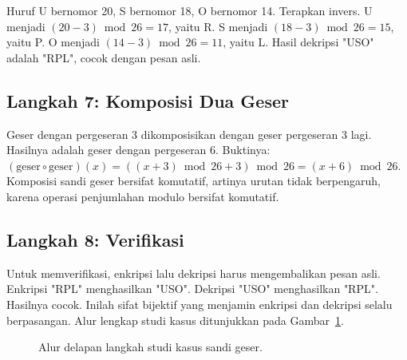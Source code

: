 \documentclass[11pt,a4paper]{article}
\begin{document}
Huruf U bernomor 20, S bernomor 18, O bernomor 14. Terapkan invers. U menjadi $(20-3) \bmod 26=17$, yaitu R. S menjadi $(18-3) \bmod 26=15$, yaitu P. O menjadi $(14-3) \bmod 26=11$, yaitu L. Hasil dekripsi "USO" adalah "RPL", cocok dengan pesan asli.

\subsection{Langkah 7: Komposisi Dua Geser}

Geser dengan pergeseran 3 dikomposisikan dengan geser pergeseran 3 lagi. Hasilnya adalah geser dengan pergeseran 6. Buktinya: $(\text{geser} \circ \text{geser})(x)=((x+3) \bmod 26+3) \bmod 26=(x+6) \bmod 26$. Komposisi sandi geser bersifat komutatif, artinya urutan tidak berpengaruh, karena operasi penjumlahan modulo bersifat komutatif.

\subsection{Langkah 8: Verifikasi}

Untuk memverifikasi, enkripsi lalu dekripsi harus mengembalikan pesan asli. Enkripsi "RPL" menghasilkan "USO". Dekripsi "USO" menghasilkan "RPL". Hasilnya cocok. Inilah sifat bijektif yang menjamin enkripsi dan dekripsi selalu berpasangan. Alur lengkap studi kasus ditunjukkan pada Gambar~\ref{fig:alur-sandi}.

\begin{figure}[H]
	\centering
	\caption{Alur delapan langkah studi kasus sandi geser.}
	\label{fig:alur-sandi}
\end{figure}
\end{document}
